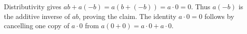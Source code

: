 Distributivity gives $ab+a(-b)=a(b+(-b))=a\cdot0=0$. Thus $a(-b)$ is the additive inverse of $ab$, proving the claim. The identity $a\cdot0=0$ follows by cancelling one copy of $a\cdot0$ from $a(0+0)=a\cdot0+a\cdot0$.
